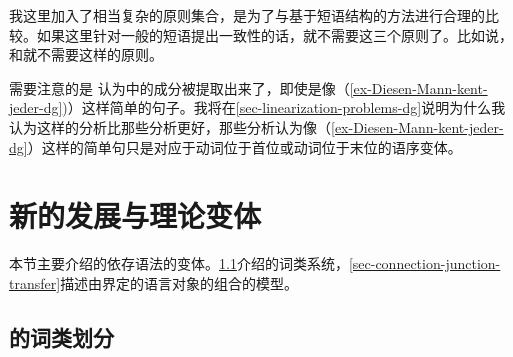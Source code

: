 我这里加入了相当复杂的原则集合，是为了与基于短语结构的方法进行合理的比较。如果这里针对一般的短语提出一致性的话，就不需要这三个原则了。比如说，\lfgc 和\hpsgc 就不需要这样的原则。

需要注意的是 \citet[]{Hudson97a}认为\vfc 中的成分被提取出来了，即使是像（\ref{ex-Diesen-Mann-kent-jeder-dg})）这样简单的句子。我将在\ref{sec-linearization-problems-dg}说明为什么我认为这样的分析比那些分析更好，那些分析认为像（\ref{ex-Diesen-Mann-kent-jeder-dg}）这样的简单句只是对应于动词位于首位或动词位于末位的语序变体。

\section{新的发展与理论变体}

本节主要介绍\tes 的依存语法的变体。\ref{sec-tesniere-pos}介绍\tes 的词类系统，\ref{sec-connection-junction-transfer}描述由\tes 界定的语言对象的组合的模型。

\subsection{\tes 的词类划分}
\label{sec-tesniere-pos}

